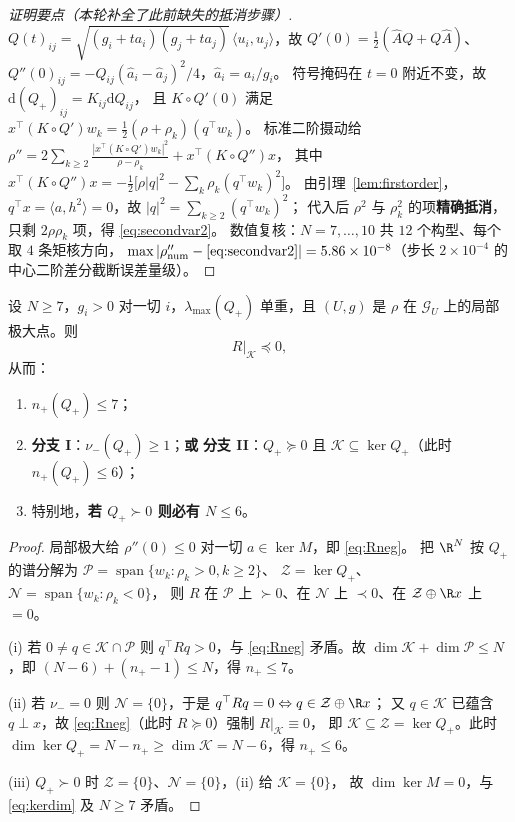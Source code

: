 \begin{proof}[证明要点（本轮补全了此前缺失的抵消步骤）]
$Q(t)_{ij}=\sqrt{(g_i+ta_i)(g_j+ta_j)}\,\langle u_i,u_j\rangle$，故
$Q'(0)=\tfrac12(\hat AQ+Q\hat A)$、$Q''(0)_{ij}=-Q_{ij}(\hat a_i-\hat a_j)^2/4$，$\hat a_i=a_i/g_i$。
符号掩码在 $t=0$ 附近不变，故 $\mathrm d(Q_+)_{ij}=K_{ij}\mathrm dQ_{ij}$，
且 $K\circ Q'(0)$ 满足 $x^\top(K\circ Q')w_k=\tfrac12(\rho+\rho_k)(q^\top w_k)$。
标准二阶摄动给
$\rho''=2\sum_{k\ge2}\frac{|x^\top(K\circ Q')w_k|^2}{\rho-\rho_k}+x^\top(K\circ Q'')x$，
其中 $x^\top(K\circ Q'')x=-\tfrac12\bigl[\rho|q|^2-\sum_k\rho_k(q^\top w_k)^2\bigr]$。
由引理~\ref{lem:firstorder}，$q^\top x=\langle a,h^2\rangle=0$，故 $|q|^2=\sum_{k\ge2}(q^\top w_k)^2$；
代入后 $\rho^2$ 与 $\rho_k^2$ 的项\textbf{精确抵消}，只剩 $2\rho\rho_k$ 项，得 \eqref{eq:secondvar2}。
数值复核：$N=7,\dots,10$ 共 $12$ 个构型、每个取 $4$ 条矩核方向，
$\max|\rho''_{\rm num}-\eqref{eq:secondvar2}|=5.86\times10^{-8}$（步长 $2\times10^{-4}$ 的中心二阶差分截断误差量级）。
\end{proof}

\begin{theorem}\label{thm:dichotomy}
设 $N\ge7$，$g_i>0$ 对一切 $i$，$\lambda_{\max}(Q_+)$ 单重，且 $(U,g)$ 是 $\rho$ 在 $\mathcal G_U$ 上的局部极大点。则
\begin{equation}\label{eq:Rneg}
R\big|_{\mathcal K}\preceq0 ,
\end{equation}
从而：
\begin{enumerate}\itemsep2pt
\item[(i)] $n_+(Q_+)\le7$；
\item[(ii)] \textbf{分支 I}：$\nu_-(Q_+)\ge1$；\quad\textbf{或}\quad
\textbf{分支 II}：$Q_+\succeq0$ 且 $\mathcal K\subseteq\ker Q_+$（此时 $n_+(Q_+)\le6$）；
\item[(iii)] 特别地，\textbf{若 $Q_+\succ0$ 则必有 $N\le6$}。
\end{enumerate}
\end{theorem}

\begin{proof}
局部极大给 $\rho''(0)\le0$ 对一切 $a\in\ker M$，即 \eqref{eq:Rneg}。
把 $\R^N$ 按 $Q_+$ 的谱分解为
$\mathcal P=\operatorname{span}\{w_k:\rho_k>0,k\ge2\}$、
$\mathcal Z=\ker Q_+$、$\mathcal N=\operatorname{span}\{w_k:\rho_k<0\}$，
则 $R$ 在 $\mathcal P$ 上 $\succ0$、在 $\mathcal N$ 上 $\prec0$、在 $\mathcal Z\oplus\R x$ 上 $=0$。

(i) 若 $0\ne q\in\mathcal K\cap\mathcal P$ 则 $q^\top Rq>0$，与 \eqref{eq:Rneg} 矛盾。故
$\dim\mathcal K+\dim\mathcal P\le N$，即 $(N-6)+(n_+-1)\le N$，得 $n_+\le7$。

(ii) 若 $\nu_-=0$ 则 $\mathcal N=\{0\}$，于是 $q^\top Rq=0\Leftrightarrow q\in\mathcal Z\oplus\R x$；
又 $q\in\mathcal K$ 已蕴含 $q\perp x$，故 \eqref{eq:Rneg}（此时 $R\succeq0$）强制 $R|_{\mathcal K}\equiv0$，
即 $\mathcal K\subseteq\mathcal Z=\ker Q_+$。此时 $\dim\ker Q_+=N-n_+\ge\dim\mathcal K=N-6$，得 $n_+\le6$。

(iii) $Q_+\succ0$ 时 $\mathcal Z=\{0\}$、$\mathcal N=\{0\}$，(ii) 给 $\mathcal K=\{0\}$，
故 $\dim\ker M=0$，与 \eqref{eq:kerdim} 及 $N\ge7$ 矛盾。
\end{proof}


